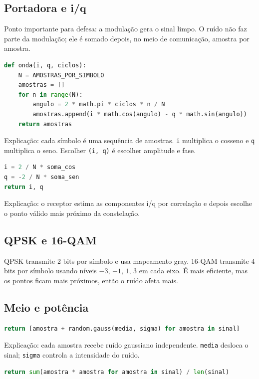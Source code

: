 \documentclass[10pt,a4paper]{article}
\begin{document}
\subsection{Portadora e i/q}

Ponto importante para defesa: a modulação gera o sinal limpo. O ruído não faz
parte da modulação; ele é somado depois, no meio de comunicação, amostra por
amostra.

\begin{lstlisting}[language=Python]
def onda(i, q, ciclos):
    N = AMOSTRAS_POR_SIMBOLO
    amostras = []
    for n in range(N):
        angulo = 2 * math.pi * ciclos * n / N
        amostras.append(i * math.cos(angulo) - q * math.sin(angulo))
    return amostras
\end{lstlisting}

Explicação: cada símbolo é uma sequência de amostras. \texttt{i} multiplica o
cosseno e \texttt{q} multiplica o seno. Escolher \texttt{(i, q)} é escolher
amplitude e fase.

\begin{lstlisting}[language=Python]
i = 2 / N * soma_cos
q = -2 / N * soma_sen
return i, q
\end{lstlisting}

Explicação: o receptor estima as componentes i/q por correlação e depois
escolhe o ponto válido mais próximo da constelação.

\subsection{QPSK e 16-QAM}

QPSK transmite 2 bits por símbolo e usa mapeamento gray. 16-QAM transmite 4
bits por símbolo usando níveis \(-3\), \(-1\), \(1\), \(3\) em cada eixo. É
mais eficiente, mas os pontos ficam mais próximos, então o ruído afeta mais.

\subsection{Meio e potência}

\begin{lstlisting}[language=Python]
return [amostra + random.gauss(media, sigma) for amostra in sinal]
\end{lstlisting}

Explicação: cada amostra recebe ruído gaussiano independente. \texttt{media}
desloca o sinal; \texttt{sigma} controla a intensidade do ruído.

\begin{lstlisting}[language=Python]
return sum(amostra * amostra for amostra in sinal) / len(sinal)
\end{lstlisting}
\end{document}
